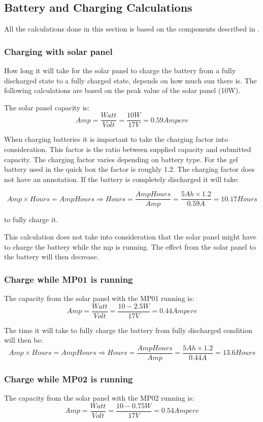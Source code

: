 \clearpage

\subsection{Battery and Charging Calculations}
All the calculations done in this section is based on the components described in . 

\subsubsection{Charging with solar panel}
How long it will take for the solar panel to charge the battery from a fully discharged state to a fully charged state, depends on how much sun there is. The following calculations are based on the peak value of the solar panel (10W). 

The solar panel capacity is:
$$Amp = \frac{Watt}{Volt} = \frac{10 W}{17 V} = 0.59 Ampere$$

When charging batteries it is important to take the charging factor into consideration. This factor is the ratio between supplied capacity and submitted capacity. The charging factor varies depending on battery type. For the gel battery used in the \gls{quick} box the factor is roughly 1.2. The charging factor does not have an annotation. 
If the battery is completely discharged it will take: 

$$Amp\times Hours = AmpHours \Rightarrow Hours =\frac{AmpHours}{Amp} = \frac{5 Ah\times 1.2}{0.59 A} = 10.17 Hours$$

to fully charge it. 

This calculation does not take into consideration that the solar panel might have to charge the battery while the \gls{mp} is running. The effect from the solar panel to the battery will then decrease. 

\subsubsection{Charge while MP01 is running}
The capacity from the solar panel with the MP01 running is: 
$$Amp = \frac{Watt}{Volt} = \frac{10-2.5 W}{17 V} = 0.44 Ampere$$

The time it will take to fully charge the battery from fully discharged condition will then be: 
$$Amp\times Hours = AmpHours \Rightarrow Hours =\frac{AmpHours}{Amp} = \frac{5 Ah\times 1.2}{0.44A} = 13.6 Hours$$

\subsubsection{Charge while MP02 is running}
The capacity from the solar panel with the MP02 running is: 
$$Amp = \frac{Watt}{Volt} = \frac{10-0.75 W}{17 V} = 0.54 Ampere$$

